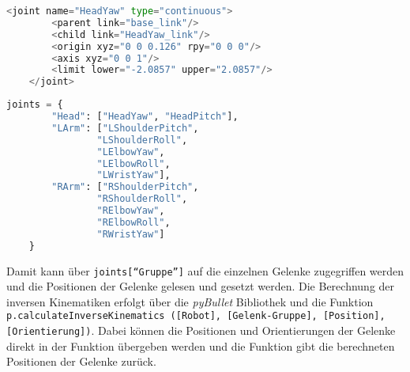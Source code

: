 \noindent
\begin{lstlisting}[language=Python, caption=Ausschnitt der URDF-Datei des Pepper, label=lst:pepper-urdf]
    <joint name="HeadYaw" type="continuous">
        <parent link="base_link"/>
        <child link="HeadYaw_link"/>
        <origin xyz="0 0 0.126" rpy="0 0 0"/>
        <axis xyz="0 0 1"/>
        <limit lower="-2.0857" upper="2.0857"/>
    </joint>
\end{lstlisting}

\begin{lstlisting}[language=Python, caption=Gelenk-Grupperierung, label=lst:gelenk-grupperierung]
    joints = {
        "Head": ["HeadYaw", "HeadPitch"],
        "LArm": ["LShoulderPitch",
                "LShoulderRoll",
                "LElbowYaw",
                "LElbowRoll",
                "LWristYaw"],
        "RArm": ["RShoulderPitch",
                "RShoulderRoll",
                "RElbowYaw",
                "RElbowRoll",
                "RWristYaw"]
    }
\end{lstlisting}
Damit kann über \texttt{joints[``Gruppe'']} auf die einzelnen Gelenke zugegriffen werden und die Positionen der Gelenke gelesen und gesetzt werden. Die Berechnung der inversen Kinematiken erfolgt über die \textit{pyBullet} Bibliothek und die Funktion \texttt{p.calculateInverseKinematics ([Robot], [Gelenk-Gruppe], [Position], [Orientierung])}. Dabei können die Positionen und Orientierungen der Gelenke direkt in der Funktion übergeben werden und die Funktion gibt die berechneten Positionen der Gelenke zurück.
\\

